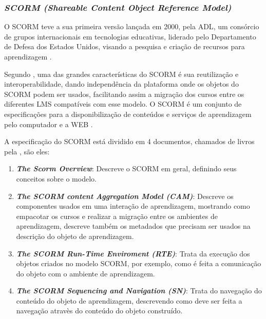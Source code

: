 \subsubsection{\textit{SCORM (Shareable Content Object Reference Model)}}
O \ac{SCORM} teve a sua primeira versão lançada em 2000, pela \ac{ADL}, um consórcio de grupos internacionais em tecnologias educativas, liderado pelo Departamento de Defesa dos Estados Unidos, visando a pesquisa e criação de recursos para aprendizagem \cite{adl}.
\par
Segundo , uma das grandes características do \ac{SCORM} é sua reutilização e interoperabilidade, dando independência da plataforma onde os objetos do SCORM podem ser usados, facilitando assim a migração dos cursos entre os diferentes \ac{LMS} compatíveis com esse modelo. O \ac{SCORM} é um conjunto de especificações para a disponibilização de conteúdos e serviços de aprendizagem pelo computador e a \ac{WEB} \cite{adl}.
\par
A especificação do \ac{SCORM} está dividido em 4 documentos, chamados de livros pela \cite{adl}, são eles:
\begin{enumerate}
  \item \textbf{\textit{The Scorm Overview}}: Descreve o \ac{SCORM} em geral, definindo seus conceitos sobre o modelo.
  \item \textbf{\textit{The SCORM content Aggregation Model (CAM)}}: Descreve os componentes usados em uma interação de aprendizagem, mostrando como empacotar os cursos e realizar a migração entre os ambientes de aprendizagem, descreve também os metadados que precisam ser usados na descrição do objeto de aprendizagem.
  \item \textbf{\textit{The SCORM Run-Time Enviroment (RTE)}}: Trata da execução dos objetos criados no modelo \ac{SCORM}, por exemplo, como é feita a comunicação do objeto com o ambiente de aprendizagem.
  \item \textbf{\textit{The SCORM Sequencing and Navigation (SN)}}: Trata do navegação do conteúdo do objeto de aprendizagem, descrevendo como deve ser feita a navegação atravès do conteúdo do objeto construído.
\end{enumerate}

